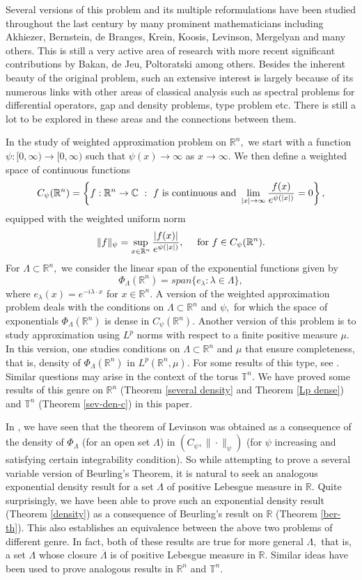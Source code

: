 \documentclass [11pt]{amsart}
\newcommand{\R}{\mathbb R}
\newcommand{\C}{\mathbb C}
\newcommand{\T}{\mathbb T}
\newcommand{\la}{\lambda}
\newcommand{\txt} {\textmd}
\numberwithin{equation}{section}
\begin{document}
Several versions of this problem and its multiple reformulations have been studied throughout the last century by many prominent mathematicians including Akhiezer, Bernstein, de Branges, Krein, Koosis, Levinson, Mergelyan and many others. This is still a very active area of research with more recent significant contributions by Bakan, de Jeu, Poltoratski among others. Besides the inherent beauty of the original problem, such an extensive interest is largely because of its numerous links with other areas of classical analysis such as spectral problems for differential operators, gap and density problems, type problem etc. There is still a lot to be explored in these areas and the connections between them.

In the study of weighted approximation problem on $\R^n,$ we start with a function $\psi:[0,\infty) \rightarrow [0,\infty)$ such that $\psi(x)\to \infty$ as $x\to \infty.$ We then define a weighted space of continuous functions $$C_{\psi}(\R^n)=\left\lbrace f : \R^n \to \C ~ : ~ f \txt{ is continuous and } \lim_{|x|\to \infty}\dfrac{f(x)}{e^{\psi(|x|)}}=0\right\rbrace,$$
equipped with the weighted uniform norm 
$$\|f\|_{\psi}=\sup_{x \in \R^n}\dfrac{|f(x)|}{e^{\psi(|x|)}},\quad \txt{ for } f\in C_{\psi}(\R^n).$$ For $\Lambda \subset \R^n,$ we consider the linear span of the exponential functions given by 
$$\Phi_{\Lambda}(\R^n)= span \lbrace e_{\la}:\la \in \Lambda \rbrace,$$ where $e_{\la}(x)=e^{-i\la \cdot x}$ for $x \in \R^n.$ A version of the weighted approximation problem deals with the conditions on $\Lambda\subset \R^n$ and $\psi,$ for which the space of exponentials $\Phi_{\Lambda}(\R^n)$ is dense in $C_{\psi}(\R^n).$ Another version of this problem is to study approximation using $L^p$ norms with respect to a finite positive measure $\mu.$ In this version, one studies conditions on $\Lambda\subset \R^n$ and $\mu$ that ensure completeness, that is, density of $\Phi_{\Lambda}(\R^n)$ in $L^p(\R^n,\mu).$ For some results of this type, see \cite{DJ, K, P}. Similar questions may arise in the context of the torus $\T^n.$  We have proved some results of this genre on $\R^n$ (Theorem \ref{several density} and Theorem \ref{Lp dense}) and $\T^n$ (Theorem \ref{sev-den-c}) in this paper.

In \cite{BRS, K}, we have seen that the theorem of Levinson was obtained as a consequence of the density of $\Phi_\Lambda$ (for an open set $\Lambda$) in $(C_\psi, \|\cdot\|_\psi)$ (for $\psi$ increasing and satisfying certain integrability condition). So while attempting to prove a several variable version of Beurling's Theorem, it is natural to seek an analogous exponential density result for a set $\Lambda$ of positive Lebesgue measure in $\R.$ Quite surprisingly, we have been able to prove such an exponential density result (Theorem \ref{density}) as a consequence of Beurling's result on $\R$ (Theorem \ref{ber-th}). This also establishes an equivalence between the above two problems of different genre. In fact, both of these results are true for more general $\Lambda,$ that is, a set $\Lambda$ whose closure $\overline{\Lambda}$ is of positive Lebesgue measure in $\R.$ Similar ideas have been used to prove analogous results in $\R^n$ and $\T^n.$ 
\end{document}
